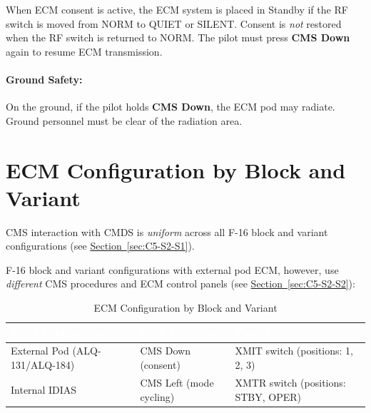 \documentclass[11pt, a4paper, twoside]{report}
\newcommand{\secref}[1]{\hyperref[#1]{Section~\ref*{#1}}}
\begin{document}
When ECM consent is active, the ECM system is placed in Standby if the RF switch is moved from NORM to QUIET or SILENT. Consent is \textit{not} restored when the RF switch is returned to NORM. The pilot must press \textbf{CMS Down} again to resume ECM transmission.

\paragraph{Ground Safety:}

On the ground, if the pilot holds \textbf{CMS Down}, the ECM pod may radiate. Ground personnel must be clear of the radiation area.

\section{ECM Configuration by Block and Variant}
\label{sec:C5-S3}

CMS interaction with CMDS is \textit{uniform} across all F-16 block and variant configurations (see \secref{sec:C5-S2-S1}).

F-16 block and variant configurations with external pod ECM, however, use \textit{different} CMS procedures and ECM control panels (see \secref{sec:C5-S2-S2}):

\begin{table}[H]
\centering
\caption{ECM Configuration by Block and Variant}
\label{tab:C5-S3-ecm-config-summary}
\small
\renewcommand{\arraystretch}{1.25}
\begin{tabular}{|>{\raggedright\arraybackslash}p{3.6cm}|>{\raggedright\arraybackslash}p{3.6cm}|>{\raggedright\arraybackslash}p{4.6cm}|}
\hline
\rowcolor{headerblue}
\textcolor{white}{\textbf{ECM Configuration}} & \textcolor{white}{\textbf{CMS Direction}} & \textcolor{white}{\textbf{Panel Control}} \\
\hline
External Pod (ALQ-131/ALQ-184) & CMS Down (consent) & XMIT switch (positions: 1, 2, 3) \\
\hline
Internal IDIAS & CMS Left (mode cycling) & XMTR switch (positions: STBY, OPER) \\
\hline
\end{tabular}
\end{table}

\end{document}
